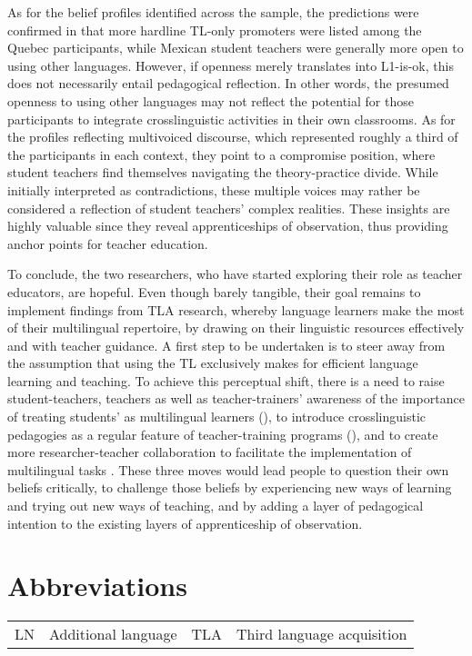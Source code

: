 \documentclass[output=paper]{../langscibook}
\begin{document}
As for the belief profiles identified across the sample, the predictions were confirmed in that more hardline TL-only promoters were listed among the Quebec participants, while Mexican student teachers were generally more open to using other languages. However, if openness merely translates into L1-is-ok, this does not necessarily entail pedagogical reflection. In other words, the presumed openness to using other languages may not reflect the potential for those participants to integrate crosslinguistic activities in their own classrooms. As for the profiles reflecting multivoiced discourse, which represented roughly a third of the participants in each context, they point to a compromise position, where student teachers find themselves navigating the theory-practice divide. While initially interpreted as contradictions, these multiple voices may rather be considered a reflection of student teachers’ complex realities. These insights are highly valuable since they reveal apprenticeships of observation, thus providing anchor points for teacher education.

To conclude, the two researchers, who have started exploring their role as teacher educators, are hopeful. Even though barely tangible, their goal remains to implement findings from TLA research, whereby language learners make the most of their multilingual repertoire, by drawing on their linguistic resources effectively and with teacher guidance. A first step to be undertaken is to steer away from the assumption that using the TL exclusively makes for efficient language learning and teaching. To achieve this perceptual shift, there is a need to raise student-teachers, teachers as well as teacher-trainers’ awareness of the importance of treating students’ as multilingual learners (\citealt{ArocenaEgañaEtAl2015}), to introduce crosslinguistic pedagogies as a regular feature of teacher-training programs (\citealt{DeAngelis2011}), and to create more researcher-teacher collaboration to facilitate the implementation of multilingual tasks \citep{GalanteEtAl2020}. These three moves would lead people to question their own beliefs critically, to challenge those beliefs by experiencing new ways of learning and trying out new ways of teaching, and by adding a layer of pedagogical intention to the existing layers of apprenticeship of observation.

\section*{Abbreviations}

\begin{tabular}{@{}llll}
  LN & Additional language & TLA & Third language acquisition
\end{tabular}




\sloppy\printbibliography[heading=subbibliography,notkeyword=this]
\end{document}
